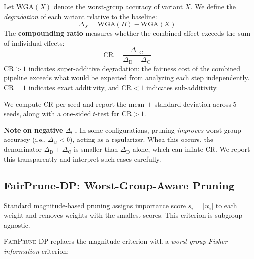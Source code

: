 \documentclass{article}
\newcommand{\CR}{\text{CR}}
\newcommand{\FairPrunDP}{\textsc{FairPrune-DP}}
\begin{document}
Let $\text{WGA}(X)$ denote the worst-group accuracy of variant $X$. We define the \emph{degradation} of each variant relative to the baseline:
\begin{equation}
    \Delta_X = \text{WGA}(B) - \text{WGA}(X)
\end{equation}
The \textbf{compounding ratio} measures whether the combined effect exceeds the sum of individual effects:
\begin{equation}
    \CR = \frac{\Delta_{\text{DC}}}{\Delta_{\text{D}} + \Delta_{\text{C}}}
    \label{eq:cr}
\end{equation}
$\CR > 1$ indicates super-additive degradation: the fairness cost of the combined pipeline exceeds what would be expected from analyzing each step independently. $\CR = 1$ indicates exact additivity, and $\CR < 1$ indicates sub-additivity.

We compute $\CR$ per-seed and report the mean $\pm$ standard deviation across 5 seeds, along with a one-sided $t$-test for $\CR > 1$.

\textbf{Note on negative $\Delta_{\text{C}}$.} In some configurations, pruning \emph{improves} worst-group accuracy (i.e., $\Delta_{\text{C}} < 0$), acting as a regularizer. When this occurs, the denominator $\Delta_{\text{D}} + \Delta_{\text{C}}$ is smaller than $\Delta_{\text{D}}$ alone, which can inflate CR. We report this transparently and interpret such cases carefully.

\subsection{FairPrune-DP: Worst-Group-Aware Pruning}
\label{sec:method_fairprune}

Standard magnitude-based pruning assigns importance score $s_i = |w_i|$ to each weight and removes weights with the smallest scores. This criterion is subgroup-agnostic.

\FairPrunDP{} replaces the magnitude criterion with a \emph{worst-group Fisher information} criterion:
\end{document}
